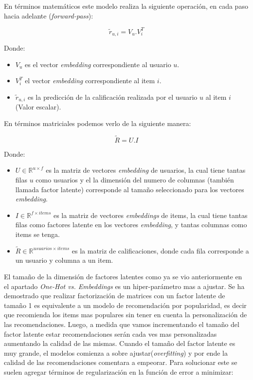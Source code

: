 \documentclass[11pt,a4paper,twoside]{thesis}
\begin{document}
\clearpage


En términos matemáticos este modelo realiza la siguiente operación, en cada paso hacia adelante (\textit{forward-pass}):

\begin{equation}
	\tilde{r}_{u, i} = V_u . V_i^{T}
\end{equation}
\begin{description}
	\item[Donde:]
\end{description}
\begin{itemize}
	\item $V_u$ es el vector \textit{embedding} correspondiente al usuario $u$.
	\item $V_i^{T}$ el vector \textit{embedding} correspondiente al item $i$.
	\item $ \tilde{r}_{u, i}$ es la predicción de la calificación realizada por el usuario $u$ al item $i$ (Valor escalar).
\end{itemize}

En términos matriciales podemos verlo de la siguiente manera:

\begin{equation}
	\tilde{R} = U.I
\end{equation}
\begin{description}
	\item[Donde:]
\end{description}
\begin{itemize}
	\item $U\in\mathbb{R}^{u \times f}$ es la matriz de vectores \textit{embedding} de usuarios, la cual tiene tantas filas $u$ como usuarios y el la dimensión del numero de columnas (también llamada factor latente) corresponde al tamaño seleccionado para los vectores \textit{embedding}. 
	\item $I\in\mathbb{R}^{f\times items}$ es la matriz de vectores \textit{embeddings} de items, la cual tiene tantas filas como factores latente en los vectores \textit{embedding}, y tantas columnas como items se tenga. 
	\item $\tilde{R}\in\mathbb{R}^{usuarios \times items}$ es la matriz de calificaciones, donde cada fila corresponde a un usuario y columna a un item.
\end{itemize}


El tamaño de la dimensión de factores latentes como ya se vio anteriormente en el apartado \textit{One-Hot vs. Embeddings} es un hiper-parámetro mas a ajustar. Se ha demostrado \cite{embeddingsizedem} que realizar factorización de matrices con un factor latente de tamaño 1 es equivalente a un modelo de recomendación por popularidad, es decir que recomienda los items mas populares sin tener en cuenta la personalización de las recomendaciones. Luego, a medida que vamos incrementando el tamaño del factor latente estar recomendaciones serán cada ves mas personalizadas aumentando la calidad de las mismas. Cuando el tamaño del factor latente es muy grande, el modelos comienza a sobre ajustar(\textit{overfitting}) y por ende la calidad de las recomendaciones comentara a empeorar. Para solucionar este se suelen agregar términos de regularización en la función de error a minimizar:
\end{document}
